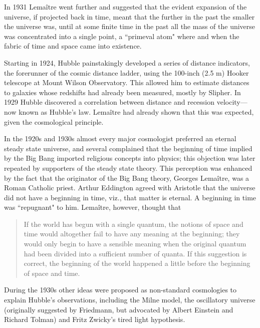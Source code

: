 \documentclass[14pt, oneside]{book}
\begin{document}
		In 1931 Lemaître went further and suggested that the evident expansion of the universe, if projected back in time, meant that the further in the past the smaller the universe was, until at some finite time in the past all the mass of the universe was concentrated into a single point, a ``primeval atom" where and when the fabric of time and space came into existence.
		
		Starting in 1924, Hubble painstakingly developed a series of distance indicators, the forerunner of the cosmic distance ladder, using the 100-inch (2.5 m) Hooker telescope at Mount Wilson Observatory. This allowed him to estimate distances to galaxies whose redshifts had already been measured, mostly by Slipher. In 1929 Hubble discovered a correlation between distance and recession velocity—now known as Hubble's law. Lemaître had already shown that this was expected, given the cosmological principle.
		
		In the 1920s and 1930s almost every major cosmologist preferred an eternal steady state universe, and several complained that the beginning of time implied by the Big Bang imported religious concepts into physics; this objection was later repeated by supporters of the steady state theory. This perception was enhanced by the fact that the originator of the Big Bang theory, Georges Lemaître, was a Roman Catholic priest. Arthur Eddington agreed with Aristotle that the universe did not have a beginning in time, viz., that matter is eternal. A beginning in time was ``repugnant" to him. Lemaître, however, thought that
		
		\blockquote{ If the world has begun with a single quantum, the notions of space and time would altogether fail to have any meaning at the beginning; they would only begin to have a sensible meaning when the original quantum had been divided into a sufficient number of quanta. If this suggestion is correct, the beginning of the world happened a little before the beginning of space and time. }
		
		During the 1930s other ideas were proposed as non-standard cosmologies to explain Hubble's observations, including the Milne model, the oscillatory universe (originally suggested by Friedmann, but advocated by Albert Einstein and Richard Tolman) and Fritz Zwicky's tired light hypothesis.
		
\end{document}
